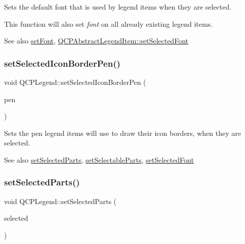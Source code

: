 Sets the default font that is used by legend items when they are selected.

This function will also set {\itshape font} on all already existing legend items.

\begin{DoxySeeAlso}{See also}
\mbox{\hyperlink{class_q_c_p_legend_aa4cda8499e3cb0f3be415edc02984c73}{set\+Font}}, \mbox{\hyperlink{class_q_c_p_abstract_legend_item_a91db5aee48617a9d3206e61376807365}{Q\+C\+P\+Abstract\+Legend\+Item\+::set\+Selected\+Font}} 
\end{DoxySeeAlso}
\mbox{\label{class_q_c_p_legend_ade93aabe9bcccaf9cf46cec22c658027}} 
\subsubsection{\texorpdfstring{set\+Selected\+Icon\+Border\+Pen()}{setSelectedIconBorderPen()}}
{\footnotesize\ttfamily void Q\+C\+P\+Legend\+::set\+Selected\+Icon\+Border\+Pen (\begin{DoxyParamCaption}\item[{const Q\+Pen \&}]{pen }\end{DoxyParamCaption})}

Sets the pen legend items will use to draw their icon borders, when they are selected.

\begin{DoxySeeAlso}{See also}
\mbox{\hyperlink{class_q_c_p_legend_a2aee309bb5c2a794b1987f3fc97f8ad8}{set\+Selected\+Parts}}, \mbox{\hyperlink{class_q_c_p_legend_a9ce60aa8bbd89f62ae4fa83ac6c60110}{set\+Selectable\+Parts}}, \mbox{\hyperlink{class_q_c_p_legend_ab580a01c3c0a239374ed66c29edf5ad2}{set\+Selected\+Font}} 
\end{DoxySeeAlso}
\mbox{\label{class_q_c_p_legend_a2aee309bb5c2a794b1987f3fc97f8ad8}} 
\subsubsection{\texorpdfstring{set\+Selected\+Parts()}{setSelectedParts()}}
{\footnotesize\ttfamily void Q\+C\+P\+Legend\+::set\+Selected\+Parts (\begin{DoxyParamCaption}\item[{const Selectable\+Parts \&}]{selected }\end{DoxyParamCaption})}

